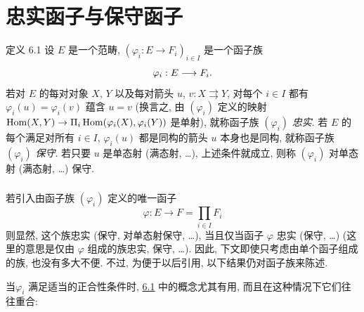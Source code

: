 

\section{忠实函子与保守函子}\pageoriginale

\begin{enonce*}{定义 6.1}
设 $E$ 是一个范畴, $(\varphi_i:E\rightarrow F_i)_{i\in I}$ 是一个函子族
$$
\varphi_i:E\longrightarrow F_i{}.
$$
若对 $E$ 的每对对象 $X$, $Y$ 以及每对箭头
$u$, $v:X\rightrightarrows Y$, 对每个 $i\in I$ 都有
$\varphi_i(u)=\varphi_i(v)$ 蕴含 $u=v$
(换言之, 由 $(\varphi_i)$ 定义的映射 $\operatorname{Hom}(X,Y)\rightarrow
\Pi_i\operatorname{Hom}(\varphi_i(X),\varphi_i(Y))$ 是单射),
就称函子族 $(\varphi_i)$ \emph{忠实}.
若 $E$ 的每个满足对所有 $i\in I$, $\varphi_i(u)$ 都是同构的箭头 $u$
本身也是同构, 就称函子族 $(\varphi_i)$ \emph{保守}.
若只要 $u$ 是单态射 (\resp 满态射, \resp \ldots), 上述条件就成立,
则称 $(\varphi_i)$ 对单态射 (\resp 满态射, \resp \ldots) 保守.
\end{enonce*}

\setcounter{subsection}{1} \setcounter{subsubsection}{0}
\subsubsection{}
若引入由函子族 $(\varphi_i)$ 定义的唯一函子
$$
\varphi:E\longrightarrow F=\prod_{i\in I} F_i
$$
则显然, 这个族忠实 (\resp 保守, \resp 对单态射保守, \resp\ldots),
当且仅当函子 $\varphi$ 忠实 (\resp 保守, \resp\ldots)
(这里的意思是仅由 $\varphi$ 组成的族忠实, \resp 保守, \resp\ldots).
因此, 下文即使只考虑由单个函子组成的族, 也没有多大不便.
不过, 为便于以后引用, 以下结果仍对函子族来陈述.

当\pageoriginale $\varphi_i$ 满足适当的正合性条件时,
\hyperref[I.def6.1]{6.1} 中的概念尤其有用, 而且在这种情况下它们往往重合:

